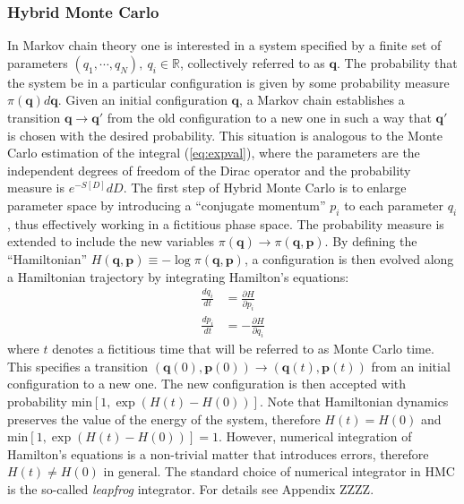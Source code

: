 \subsubsection{Hybrid Monte Carlo}
In Markov chain theory one is interested in a system specified by a finite set of parameters $(q_1, \cdots, q_N), \ q_i \in \mathbb{R}$, collectively referred to as $\mathbf{q}$. The probability that the system be in a particular configuration is given by some probability measure $\pi (\mathbf{q}) d\mathbf{q}$. Given an initial configuration $\mathbf{q}$, a Markov chain establishes a transition $\mathbf{q} \rightarrow \mathbf{q}'$ from the old configuration to a new one in such a way that $\mathbf{q}'$ is chosen with the desired probability.\newline 
This situation is analogous to the Monte Carlo estimation of the integral (\ref{eq:expval}), where the parameters are the independent degrees of freedom of the Dirac operator and the probability measure is $e^{-S[D]}dD$.\newline
The first step of Hybrid Monte Carlo is to enlarge parameter space by introducing a ``conjugate momentum'' $p_i$ to each parameter $q_i$, thus effectively working in a fictitious phase space. The probability measure is extended to include the new variables $\pi (\mathbf{q}) \rightarrow \pi (\mathbf{q}, \mathbf{p})$. By defining the ``Hamiltonian'' $H(\mathbf{q}, \mathbf{p}) \equiv -\log \pi (\mathbf{q}, \mathbf{p})$, a configuration is then evolved along a Hamiltonian trajectory by integrating Hamilton's equations:
\begin{align}
\frac{dq_i}{dt} &= \frac{\partial{H}}{\partial{p_i}} \label{eq:dqdt} \\
\frac{dp_i}{dt} &= -\frac{\partial{H}}{\partial{q_i}} \label{eq:dpdt}
\end{align}
where $t$ denotes a fictitious time that will be referred to as Monte Carlo time. This specifies a transition $(\mathbf{q}(0), \mathbf{p}(0)) \rightarrow (\mathbf{q}(t), \mathbf{p}(t))$ from an initial configuration to a new one. The new configuration is then accepted with probability $\text{min}[1, \exp (H(t)-H(0))]$. \newline
Note that Hamiltonian dynamics preserves the value of the energy of the system, therefore $H(t) = H(0)$ and $\text{min}[1, \exp (H(t)-H(0))] = 1$. However, numerical integration of Hamilton's equations is a non-trivial matter that introduces errors, therefore $H(t) \neq H(0)$ in general. The standard choice of numerical integrator in HMC is the so-called \textit{leapfrog} integrator. For details see Appendix ZZZZ.

